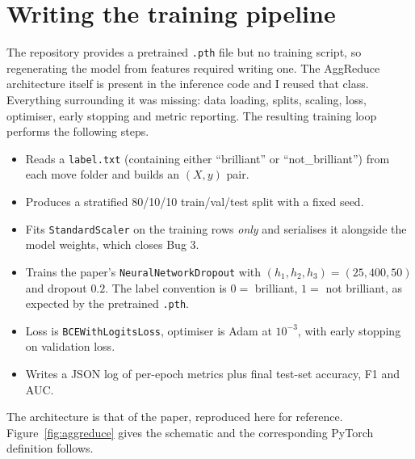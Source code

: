 \documentclass[11pt,a4paper]{article}
\begin{document}
\section{Writing the training pipeline}
\label{sec:train}

The repository provides a pretrained \texttt{.pth} file but no
training script, so regenerating the model from features required
writing one. The AggReduce architecture itself is present in the
inference code and I reused that class. Everything surrounding it was
missing: data loading, splits, scaling, loss, optimiser, early
stopping and metric reporting. The resulting training loop performs
the following steps.

\begin{itemize}[leftmargin=*]
  \item Reads a \texttt{label.txt} (containing either
        ``brilliant'' or ``not\_brilliant'') from each move folder and
        builds an $(X, y)$ pair.
  \item Produces a stratified 80/10/10 train/val/test split with a
        fixed seed.
  \item Fits \texttt{StandardScaler} on the training rows \emph{only}
        and serialises it alongside the model weights, which closes
        Bug 3.
  \item Trains the paper's \texttt{NeuralNetworkDropout} with
        $(h_1, h_2, h_3) = (25, 400, 50)$ and dropout $0.2$.
        The label convention is $0 = $ brilliant, $1 = $ not
        brilliant, as expected by the pretrained \texttt{.pth}.
  \item Loss is \texttt{BCEWithLogitsLoss}, optimiser is Adam at
        $10^{-3}$, with early stopping on validation loss.
  \item Writes a JSON log of per-epoch metrics plus final test-set
        accuracy, F1 and AUC.
\end{itemize}

The architecture is that of the paper, reproduced here for reference.
Figure~\ref{fig:aggreduce} gives the schematic and the corresponding
PyTorch definition follows.
\end{document}
